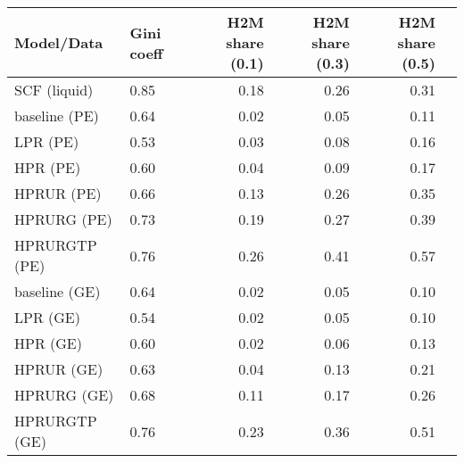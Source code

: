 \begin{tabular}{llrrrr}
\hline \hline 
        Model/Data  &  Gini coeff &  H2M share (0.1) &  H2M share (0.3) &  H2M share (0.5) \\
\hline \hline 
  SCF (liquid) &        0.85 &             0.18 &             0.26 &             0.31 \\
\hline \hline 
  baseline (PE) &        0.64 &             0.02 &             0.05 &             0.11 \\
\hline 
      LPR (PE) &        0.53 &             0.03 &             0.08 &             0.16 \\
      HPR (PE) &        0.60 &             0.04 &             0.09 &             0.17 \\
    HPRUR (PE) &        0.66 &             0.13 &             0.26 &             0.35 \\
   HPRURG (PE) &        0.73 &             0.19 &             0.27 &             0.39 \\
  HPRURGTP (PE) &        0.76 &             0.26 &             0.41 &             0.57 \\
\hline \hline 
 baseline (GE) &        0.64 &             0.02 &             0.05 &             0.10 \\
\hline 
     LPR (GE) &        0.54 &             0.02 &             0.05 &             0.10 \\
     HPR (GE) &        0.60 &             0.02 &             0.06 &             0.13 \\
   HPRUR (GE) &        0.63 &             0.04 &             0.13 &             0.21 \\
   HPRURG (GE) &        0.68 &             0.11 &             0.17 &             0.26 \\
 HPRURGTP (GE) &        0.76 &             0.23 &             0.36 &             0.51 \\
\hline \hline 
\end{tabular}

